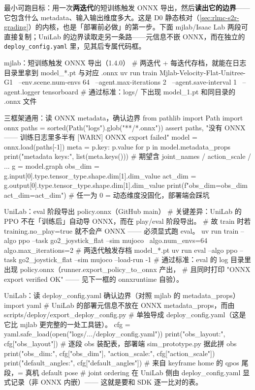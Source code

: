 最小可跑目标：用一次\textbf{两迭代}的短训练触发 ONNX 导出，然后\textbf{读出它的边界}——它包含什么 metadata、输入输出维度多大。这是 D0 静态核对（\cref{sec:rlmc-s2r-grading}）的内核，也是「部署前必做」的第一步。下面 mjlab/Isaac Lab 两段可直接复制；UniLab 的边界读取走另一条路——元信息不嵌 ONNX，而在独立的 \verb|deploy_config.yaml| 里，见其后专属代码框。

\begin{codebox}[bash]{mjlab：短训练触发 ONNX 导出（1.4.0）}
# 两迭代 + 每迭代存档，就能在日志目录里拿到 model_*.pt 与对应 .onnx
uv run train Mjlab-Velocity-Flat-Unitree-G1 \
  --env.scene.num-envs 64 \
  --agent.max-iterations 2 \
  --agent.save-interval 1 \
  --agent.logger tensorboard
# 通过标准：logs/ 下出现 model_1.pt 和同目录的 .onnx 文件
\end{codebox}

\begin{codebox}[Python]{三框架通用：读 ONNX metadata，确认边界}
from pathlib import Path
import onnx
paths = sorted(Path("logs").glob("**/*.onnx"))
assert paths, "没有 ONNX —— 训练日志里多半有 [WARN] ONNX export failed"
model = onnx.load(paths[-1])
meta = {p.key: p.value for p in model.metadata_props}
print("metadata keys:", list(meta.keys()))   # 期望含 joint_names / action_scale / ...
g = model.graph
obs_dim = g.input[0].type.tensor_type.shape.dim[1].dim_value
act_dim = g.output[0].type.tensor_type.shape.dim[1].dim_value
print(f"obs_dim={obs_dim}  act_dim={act_dim}")   # 任一为 0 = 动态维度没固化，部署端会踩坑
\end{codebox}

\begin{codebox}[bash]{UniLab：eval 阶段导出 policy.onnx（GitHub main）}
# 关键差异：UniLab 的 PPO 不在「训练后」自动导 ONNX，而在 play/eval 阶段导出。
# 故 train 时若 training.no_play=true 就不会产 ONNX —— 必须显式跑 eval。
uv run train --algo ppo --task go2_joystick_flat --sim mujoco \
  algo.num_envs=64 algo.max_iterations=2          # 两迭代触发存档 model_*.pt
uv run eval --algo ppo --task go2_joystick_flat --sim mujoco --load-run -1
# 通过标准：eval 的 log 目录里出现 policy.onnx（runner.export_policy_to_onnx 产出，
#   且同时打印 "ONNX export verified OK" —— 见下一框的 onnxruntime 自验）。
\end{codebox}

\begin{codebox}[Python]{UniLab：读 deploy\_config.yaml 确认边界（对照 mjlab 的 metadata\_props）}
import yaml
# UniLab 的部署元信息不放在 ONNX metadata_props，而由 scripts/deploy/export_deploy_config.py
# 单独导成 deploy_config.yaml（这是它比 mjlab 更完整的一处工具链）。
cfg = yaml.safe_load(open("logs/.../deploy_config.yaml"))
print("obs_layout:", cfg["obs_layout"])          # 逐段 obs 装配表，部署端 sim_prototype.py 据此拼 obs
print("obs_dim:", cfg["obs_dim"], "action_scale:", cfg["action_scale"])
print("default_angles:", cfg["default_angles"])  # 来自 keyframe home 的 qpos 尾段，= 真机 default pose
# joint ordering 在 UniLab 侧由 deploy_config.yaml 显式记录（非 ONNX 内嵌）—— 这就是要和 SDK 逐一比对的表。
\end{codebox}

